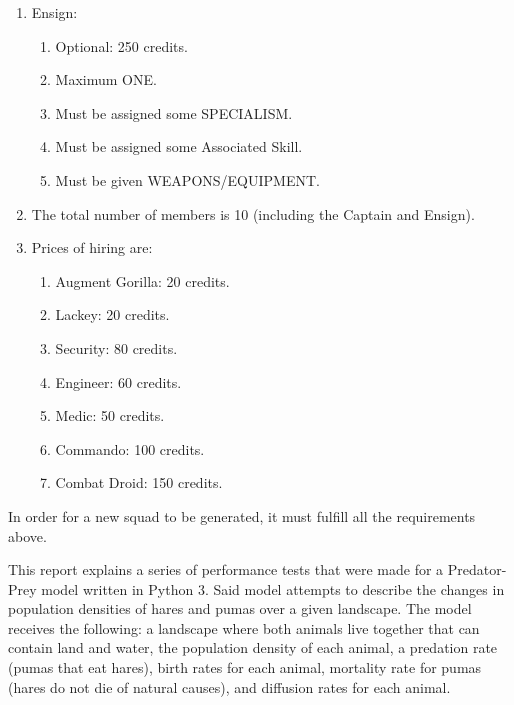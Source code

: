 \documentclass[12pt,a4paper]{article}
\begin{document}
\begin{enumerate}
\begin{enumerate}
                \end{enumerate}
 \item Ensign: \begin{enumerate}
                \item Optional: 250 credits.
                \item Maximum ONE.
                \item Must be assigned some SPECIALISM.
                \item Must be assigned some Associated Skill.
                \item Must be given WEAPONS/EQUIPMENT.
               \end{enumerate}
 \item The total number of members is 10 (including the Captain and Ensign).
 \item Prices of hiring are: \begin{enumerate}
                              \item Augment Gorilla: 20 credits.
                              \item Lackey: 20 credits.
                              \item Security: 80 credits.
                              \item Engineer: 60 credits.
                              \item Medic: 50 credits.
                              \item Commando: 100 credits.
                              \item Combat Droid: 150 credits.
                             \end{enumerate}
\end{enumerate}

In order for a new squad to be generated, it must fulfill all the requirements above. 







This report explains a series of performance tests that were made for a 
Predator-Prey model written in Python 3. Said model attempts to describe the 
changes in population densities of hares and pumas over a given landscape. The 
model receives the 
following: a landscape where both animals live together that can contain land 
and water, the population density of each animal, a predation rate (pumas that 
eat hares), birth rates for each animal, mortality rate for pumas (hares do not 
die of natural causes), and diffusion rates for each animal. 
\end{document}
